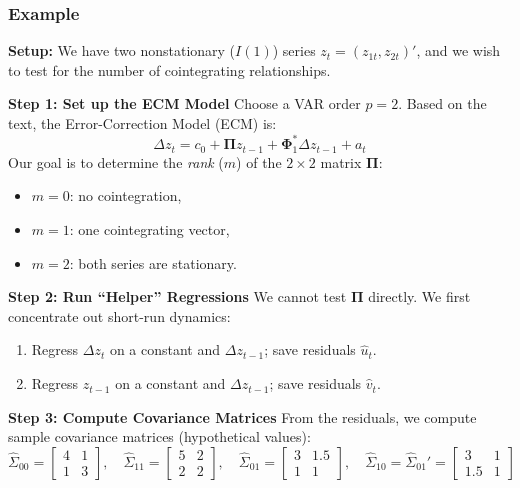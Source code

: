 \begin{frame}[allowframebreaks]
	\frametitle{Example}
	\small
		
	\textbf{Setup:}
	We have two nonstationary (\(I(1)\)) series \(z_t = (z_{1t}, z_{2t})'\), and we wish to test for the number of cointegrating relationships.
	
	\textbf{Step 1: Set up the ECM Model}
	Choose a VAR order \(p = 2\). Based on the text, the Error-Correction Model (ECM) is:
	\[
	\Delta z_t = c_0 + \boldsymbol{\Pi} z_{t-1} + \boldsymbol{\Phi}_1^* \Delta z_{t-1} + a_t
	\]
	Our goal is to determine the \emph{rank} (\(m\)) of the \(2\times2\) matrix \(\boldsymbol{\Pi}\):
	\begin{itemize}
		\item \(m = 0\): no cointegration,
		\item \(m = 1\): one cointegrating vector,
		\item \(m = 2\): both series are stationary.
	\end{itemize}
	
	\framebreak
	\textbf{Step 2: Run ``Helper'' Regressions}
	We cannot test \(\boldsymbol{\Pi}\) directly. We first concentrate out short-run dynamics:
	\begin{enumerate}
		\item Regress \(\Delta z_t\) on a constant and \(\Delta z_{t-1}\); save residuals \(\hat{u}_t\).
		\item Regress \(z_{t-1}\) on a constant and \(\Delta z_{t-1}\); save residuals \(\hat{v}_t\).
	\end{enumerate}

	\framebreak
	\textbf{Step 3: Compute Covariance Matrices}
	From the residuals, we compute sample covariance matrices (hypothetical values):
	\[
	\hat{\Sigma}_{00} = 
	\begin{bmatrix}
		4 & 1\\
		1 & 3
	\end{bmatrix}, \quad
	\hat{\Sigma}_{11} =
	\begin{bmatrix}
		5 & 2\\
		2 & 2
	\end{bmatrix}, \quad
	\hat{\Sigma}_{01} =
	\begin{bmatrix}
		3 & 1.5\\
		1 & 1
	\end{bmatrix}, \quad
	\hat{\Sigma}_{10} = \hat{\Sigma}_{01}' =
	\begin{bmatrix}
		3 & 1\\
		1.5 & 1
	\end{bmatrix}
	\]
	

\end{frame}
